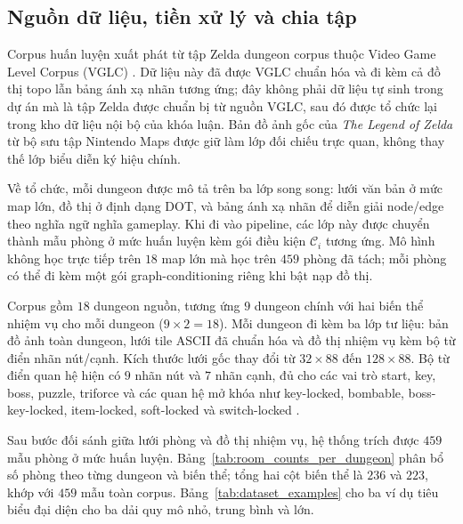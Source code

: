\documentclass[oneside,a4paper,12pt]{extreport}
\begin{document}
\subsection{Nguồn dữ liệu, tiền xử lý và chia tập}
Corpus huấn luyện xuất phát từ tập Zelda dungeon corpus thuộc Video Game Level Corpus (VGLC) \cite{summerville2016vglc,summerville2018pcgml}. Dữ liệu này đã được VGLC chuẩn hóa và đi kèm cả đồ thị topo lẫn bảng ánh xạ nhãn tương ứng; đây không phải dữ liệu tự sinh trong dự án mà là tập Zelda được chuẩn bị từ nguồn VGLC, sau đó được tổ chức lại trong kho dữ liệu nội bộ của khóa luận. Bản đồ ảnh gốc của \textit{The Legend of Zelda} từ bộ sưu tập Nintendo Maps \cite{brunsNesMapsZelda} được giữ làm lớp đối chiếu trực quan, không thay thế lớp biểu diễn ký hiệu chính.

Về tổ chức, mỗi dungeon được mô tả trên ba lớp song song: lưới văn bản ở mức map lớn, đồ thị ở định dạng DOT, và bảng ánh xạ nhãn để diễn giải node/edge theo nghĩa ngữ nghĩa gameplay. Khi đi vào pipeline, các lớp này được chuyển thành mẫu phòng ở mức huấn luyện kèm gói điều kiện $\mathcal{C}_i$ tương ứng. Mô hình không học trực tiếp trên $18$ map lớn mà học trên $459$ phòng đã tách; mỗi phòng có thể đi kèm một gói graph-conditioning riêng khi bật nạp đồ thị.

Corpus gồm $18$ dungeon nguồn, tương ứng $9$ dungeon chính với hai biến thể nhiệm vụ cho mỗi dungeon ($9\times 2=18$). Mỗi dungeon đi kèm ba lớp tư liệu: bản đồ ảnh toàn dungeon, lưới tile ASCII đã chuẩn hóa và đồ thị nhiệm vụ kèm bộ từ điển nhãn nút/cạnh. Kích thước lưới gốc thay đổi từ $32\times 88$ đến $128\times 88$. Bộ từ điển quan hệ hiện có $9$ nhãn nút và $7$ nhãn cạnh, đủ cho các vai trò start, key, boss, puzzle, triforce và các quan hệ mở khóa như key-locked, bombable, boss-key-locked, item-locked, soft-locked và switch-locked \cite{summerville2015zelda,summerville2015samplinghyrule}.

Sau bước đối sánh giữa lưới phòng và đồ thị nhiệm vụ, hệ thống trích được $459$ mẫu phòng ở mức huấn luyện. Bảng~\ref{tab:room_counts_per_dungeon} phân bổ số phòng theo từng dungeon và biến thể; tổng hai cột biến thể là $236$ và $223$, khớp với $459$ mẫu toàn corpus. Bảng~\ref{tab:dataset_examples} cho ba ví dụ tiêu biểu đại diện cho ba dải quy mô nhỏ, trung bình và lớn.
\end{document}
